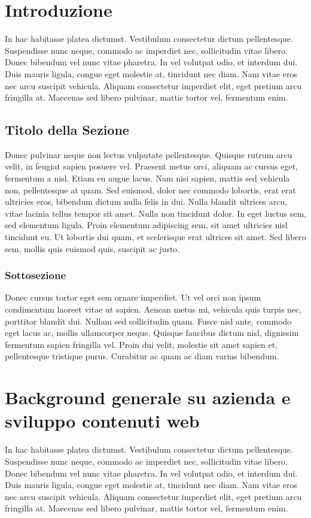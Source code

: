 \documentclass[target=mst,aauheader=,style=]{thud}
\begin{document}
\chapter{Introduzione}
In hac habitasse platea dictumst. Vestibulum consectetur dictum pellentesque. Suspendisse nunc neque, commodo ac imperdiet nec, sollicitudin vitae libero. Donec bibendum vel nunc vitae pharetra. In vel volutpat odio, et interdum dui. Duis mauris ligula, congue eget molestie at, tincidunt nec diam. Nam vitae eros nec arcu suscipit vehicula. Aliquam consectetur imperdiet elit, eget pretium arcu fringilla at. Maecenas sed libero pulvinar, mattis tortor vel, fermentum enim.

\section{Titolo della Sezione}
Donec pulvinar neque non lectus vulputate pellentesque. Quisque rutrum arcu velit, in feugiat sapien posuere vel. Praesent metus orci, aliquam ac cursus eget, fermentum a nisl. Etiam eu augue lacus. Nam nisi sapien, mattis sed vehicula non, pellentesque at quam. Sed euismod, dolor nec commodo lobortis, erat erat ultricies eros, bibendum dictum nulla felis in dui. Nulla blandit ultrices arcu, vitae lacinia tellus tempor sit amet. Nulla non tincidunt dolor. In eget luctus sem, sed elementum ligula. Proin elementum adipiscing sem, sit amet ultricies nisl tincidunt eu. Ut lobortis dui quam, et scelerisque erat ultrices sit amet. Sed libero sem, mollis quis euismod quis, suscipit ac justo.

\subsection{Sottosezione}
Donec cursus tortor eget sem ornare imperdiet. Ut vel orci non ipsum condimentum laoreet vitae ut sapien. Aenean metus mi, vehicula quis turpis nec, porttitor blandit dui. Nullam sed sollicitudin quam. Fusce nisl ante, commodo eget lacus ac, mollis ullamcorper neque. Quisque faucibus dictum nisl, dignissim fermentum sapien fringilla vel. Proin dui velit, molestie sit amet sapien et, pellentesque tristique purus. Curabitur ac quam ac diam varius bibendum.

\chapter{Background generale su azienda e sviluppo contenuti web}
In hac habitasse platea dictumst. Vestibulum consectetur dictum pellentesque. Suspendisse nunc neque, commodo ac imperdiet nec, sollicitudin vitae libero. Donec bibendum vel nunc vitae pharetra. In vel volutpat odio, et interdum dui. Duis mauris ligula, congue eget molestie at, tincidunt nec diam. Nam vitae eros nec arcu suscipit vehicula. Aliquam consectetur imperdiet elit, eget pretium arcu fringilla at. Maecenas sed libero pulvinar, mattis tortor vel, fermentum enim.
\end{document}
